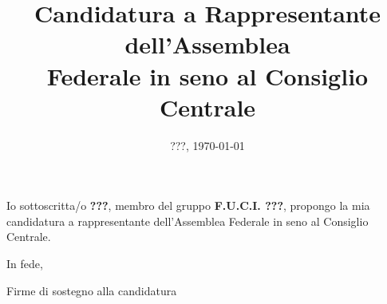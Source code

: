 \documentclass{fuci-article}
\title{
  Candidatura a Rappresentante dell'Assemblea \\
  Federale in seno al Consiglio Centrale
}
\date{???, \today}
\begin{document}
\maketitle

Io sottoscritta/o \textbf{???}, membro del gruppo \textbf{F.U.C.I. ???},
propongo la mia candidatura a rappresentante dell'Assemblea Federale in seno al
Consiglio Centrale.

\vspace{25pt}

\begin{flushright}
  In fede, \\
\end{flushright}

Firme di sostegno alla candidatura

\end{document}
